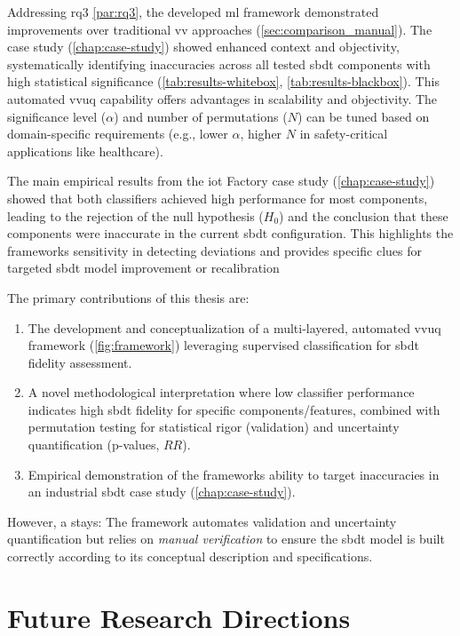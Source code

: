 Addressing \gls{rq}3 \autoref{par:rq3}, the developed \gls{ml} framework demonstrated improvements over traditional \gls{vv} approaches (\autoref{sec:comparison_manual}). The case study (\autoref{chap:case-study}) showed enhanced context and objectivity, systematically identifying inaccuracies across all tested \gls{sbdt} components with high statistical significance (\autoref{tab:results-whitebox}, \autoref{tab:results-blackbox}). This automated \gls{vvuq} capability offers advantages in scalability and objectivity. The significance level ($\alpha$) and number of permutations ($N$) can be tuned based on domain-specific requirements (e.g., lower $\alpha$, higher $N$ in safety-critical applications like healthcare).

The main empirical results from the \gls{iot} Factory case study (\autoref{chap:case-study}) showed that both classifiers achieved high performance for most components, leading to the rejection of the null hypothesis ($H_0$) and the conclusion that these components were inaccurate in the current \gls{sbdt} configuration. This highlights the frameworks sensitivity in detecting deviations and provides specific clues for targeted \gls{sbdt} model improvement or recalibration

The primary contributions of this thesis are:
\begin{enumerate}
  \item The development and conceptualization of a multi-layered, automated \gls{vvuq} framework (\autoref{fig:framework}) leveraging supervised classification for \gls{sbdt} fidelity assessment.
  \item A novel methodological interpretation where low classifier performance indicates high \gls{sbdt} fidelity for specific components/features, combined with permutation testing for statistical rigor (validation) and uncertainty quantification (p-values, $RR$).
  \item Empirical demonstration of the frameworks ability to target inaccuracies in an industrial \gls{sbdt} case study (\autoref{chap:case-study}).
\end{enumerate}

However, a  stays: The framework automates validation and uncertainty quantification but relies on \textit{manual verification} to ensure the \gls{sbdt} model is built correctly according to its conceptual description and specifications.

\section{Future Research Directions}
\label{sec:conclusion_future_work}

